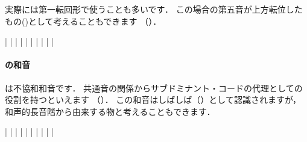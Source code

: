 \documentclass[dvipdfmx,uplatex,b5paper,openany,jbase=12Q,nomag*,textwidth-limit=44%
               ]{gachimuchi}
\begin{document}
実際には第一転回形で使うことも多いです．
この場合の第五音が上方転位したもの()として考えることもできます
（）．

\begin{floatMusic}[pos=ht]
  \Startpiece%
  \znotes|\en
  \NOTes
  |%
  \en\bar
  \NOTEs
  |%
  \en\doublebar
  \NOTEs
  |%
  \en\bar
  \NOTEs
  |%
  \en\doublebar
  \NOTes
  \sk%
  |%
  \en\bar
  \NOTes
  \Mryaku\sk%
  |%
  \Mryaku\sk
  \en\setdoublebar
  \endpiece%
\end{floatMusic}

\paragraph{\Gnii\Dimt の和音}
\Gnii\Dimt は不協和和音です．
共通音の関係からサブドミナント・コードの代理としての役割を持つといえます
（）．
この和音はしばしば（）として認識されますが，
和声的長音階から由来する物と考えることもできます．

\begin{floatMusic}[pos=ht]
  \Startpiece%
  \znotes|\en
  \NOTes
  |%
  \en\bar
  \NOTEs
  |%
  \en\doublebar
  \NOTEs
  |%
  \en\bar
  \NOTEs
  |%
  \en\doublebar
  \NOTes
  |%
  \en\bar
  \NOTes
  \Mryaku\sk%
  |%
  \Mryaku\sk
  \en\setdoublebar
  \endpiece%
\end{floatMusic}
\end{document}
